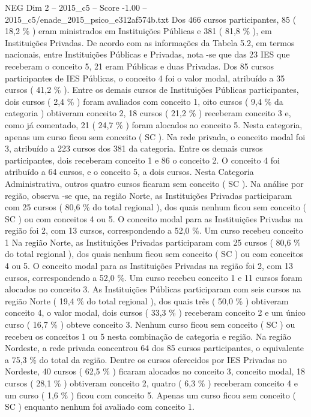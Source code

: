 \begin{textsample}{NEG Dim 2 – 2015\_c5 – Score -1.00 – 2015\_c5/enade\_2015\_psico\_e312af574b.txt}
Dos 466 cursos participantes, 85 ( 18,2 \% ) eram ministrados em Instituições Públicas e 381 ( 81,8 \% ), em Instituições Privadas.
De acordo com as informações da Tabela 5.2, em termos nacionais, entre Instituições Públicas e Privadas, nota -se que das 23 IES que receberam o conceito 5, 21 eram Públicas e duas Privadas.
Dos 85 cursos participantes de IES Públicas, o conceito 4 foi o valor modal, atribuído a 35 cursos ( 41,2 \% ).
Entre os demais cursos de Instituições Públicas participantes, dois cursos ( 2,4 \% ) foram avaliados com conceito 1, oito cursos ( 9,4 \% da categoria ) obtiveram conceito 2, 18 cursos ( 21,2 \% ) receberam conceito 3 e, como já comentado, 21 ( 24,7 \% ) foram alocados ao conceito 5.
Nesta categoria, apenas um curso ficou sem conceito ( SC ).
Na rede privada, o conceito modal foi 3, atribuído a 223 cursos dos 381 da categoria.
Entre os demais cursos participantes, dois receberam conceito 1 e 86 o conceito 2.
O conceito 4 foi atribuído a 64 cursos, e o conceito 5, a dois cursos.
Nesta Categoria Administrativa, outros quatro cursos ficaram sem conceito ( SC ).
Na análise por região, observa -se que, na região Norte, as Instituições Privadas participaram com 25 cursos ( 80,6 \% do total regional ), dos quais nenhum ficou sem conceito ( SC ) ou com conceitos 4 ou 5.
O conceito modal para as Instituições Privadas na região foi 2, com 13 cursos, correspondendo a 52,0 \%.
Um curso recebeu conceito 1 Na região Norte, as Instituições Privadas participaram com 25 cursos ( 80,6 \% do total regional ), dos quais nenhum ficou sem conceito ( SC ) ou com conceitos 4 ou 5.
O conceito modal para as Instituições Privadas na região foi 2, com 13 cursos, correspondendo a 52,0 \%.
Um curso recebeu conceito 1 e 11 cursos foram alocados no conceito 3.
As Instituições Públicas participaram com seis cursos na região Norte ( 19,4 \% do total regional ), dos quais três ( 50,0 \% ) obtiveram conceito 4, o valor modal, dois cursos ( 33,3 \% ) receberam conceito 2 e um único curso ( 16,7 \% ) obteve conceito 3.
Nenhum curso ficou sem conceito ( SC ) ou recebeu os conceitos 1 ou 5 nesta combinação de categoria e região.
Na região Nordeste, a rede privada concentrou 64 dos 85 cursos participantes, o equivalente a 75,3 \% do total da região.
Dentre os cursos oferecidos por IES Privadas no Nordeste, 40 cursos ( 62,5 \% ) ficaram alocados no conceito 3, conceito modal, 18 cursos ( 28,1 \% ) obtiveram conceito 2, quatro ( 6,3 \% ) receberam conceito 4 e um curso ( 1,6 \% ) ficou com conceito 5.
Apenas um curso ficou sem conceito ( SC ) enquanto nenhum foi avaliado com conceito 1.

\end{textsample}
